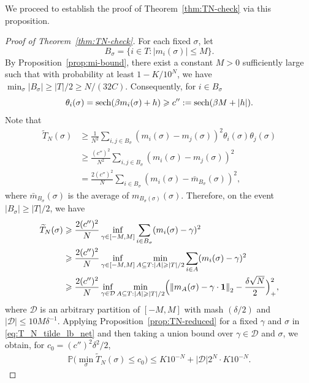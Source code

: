 \documentclass[letterpaper,11pt,reqno]{amsart}
\renewcommand{\le}{\leqslant}
\renewcommand{\ge}{\geqslant}
\newcommand{\norm}[1]{\left\Vert#1\right\Vert}
\newcommand{\abs}[1]{\left\vert#1\right\vert}
\newcommand{\mv}[1]{\boldsymbol{#1}}\newcommand{\mvinfty}{\boldsymbol{\infty}}\newcommand{\mvzero}{\boldsymbol{0}}
\newcommand{\mvm}{{m}}
\newcommand{\mvgs}{{\sigma}}
\newcommand{\bP}{\mathbb{P}}\newcommand{\bQ}{\mathbb{Q}}\newcommand{\bR}{\mathbb{R}}
\DeclareMathOperator{\sech}{sech}
\begin{document}
We proceed to establish the proof of Theorem~\ref{thm:TN-check} via this proposition. 

\begin{proof}[Proof of Theorem~\ref{thm:TN-check}]
For each fixed $\mvgs$, let 
\[ B_{\mvgs} =  \{ i \in T: \abs{m_i(\mvgs)}  \le M\}. \]
By Proposition~\ref{prop:mi-bound}, there exist a constant $M>0$ sufficiently large such that with probability at least $1-K/10^{N}$, 
we have $\min_{\mvgs}\abs{B_{\mvgs}}\ge {\abs{T}}/{2} \ge {N}/{(32C)}$.
Consequently,  for $i\in B_{\mvgs}$
\[
\theta_i(\mvgs) = \sech(\gb m_i(\mvgs)+h) \ge c'':= \sech(\gb M +|h|).
\]
Note that 
\begin{align*}
    \widetilde{T}_N(\mvgs) & \ge \frac{1}{N^2} \sum_{i,j \in B_{\mvgs}} (m_i(\mvgs) - m_j(\mvgs))^2\theta_i(\mvgs) \theta_j(\mvgs) \\
    & \ge \frac{(c'')^2 }{N^2}  \sum_{i,j \in B_{\mvgs}} (m_i(\mvgs) - m_j(\mvgs))^2 \\
    &= \frac{2 (c'')^2 }{N} \sum_{i \in B_{\mvgs}} (m_i(\mvgs) - \bar{m}_{B_{\mvgs}}(\mvgs))^2,
\end{align*}
where $\bar m_{B_{\mvgs}}(\mvgs)$ is the average of $\mvm_{B_{\mvgs}(\mvgs)}(\mvgs).$ 
Therefore, on the event $|B_{\mvgs}| \ge  \abs{T}/{2} $, we have
\begin{align}
 \widetilde{T}_N(\mvgs) &\ge \frac{2 (c'')^2 }{N}  \inf_{ \gamma \in [-M, M]} \sum_{i \in B_{\mvgs}} (m_i(\mvgs) - \gamma)^2  \nonumber \\
&\ge \frac{2 (c'')^2 }{N}  \inf_{ \gamma \in [-M, M]} \min_{ A \subseteq T: |A| \ge |T|/2} \sum_{i \in A} (m_i(\mvgs) - \gamma)^2 \nonumber  \\
&\ge \frac{2 (c'')^2 }{N}  \inf_{ \gamma \in \mathcal{D} } \min_{ A \subseteq T: |A| \ge |T|/2} \Bigl ( \norm{\mvm_A(\mvgs) - \gamma\cdot \mv1}_2   - \frac{\delta \sqrt{N}}{2}  \Bigr)_+^2,  \label{eq:T_N_tilde_lb_net}
\end{align}
where $\mathcal{D}$ is an arbitrary partition of $[-M,M]$ with mash $(\delta/2)$ and $|\mathcal{D}| \le 10 M \delta^{-1}$.
 Applying Proposition~\ref{prop:TN-reduced} for  a fixed $\gamma$ and $\mvgs$ in  \eqref{eq:T_N_tilde_lb_net} and then taking a union bound over $\gamma \in \mathcal{D}$ and $\mvgs $, we obtain, for $c_0  = (c'')^2  \delta^2/2$,
\begin{align*}
\bP\bigl(\min_{\mvgs} \widetilde{T}_N(\mvgs) \le c_0\bigr) \le K10^{- N} + |\mathcal{D}|2^N \cdot  K 10^{-N}.
\end{align*}

\end{proof}
\end{document}
